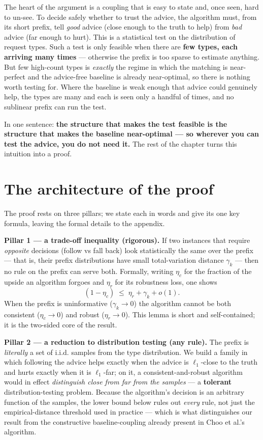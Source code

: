 The heart of the argument is a coupling that is easy to state and, once seen, hard to
un-see. To decide safely whether to trust the advice, the algorithm must, from its short
prefix, tell \emph{good} advice (close enough to the truth to help) from \emph{bad} advice (far enough
to hurt). This is a statistical test on the distribution of request types. Such a test is
only feasible when there are \textbf{few types, each arriving many times} --- otherwise the prefix
is too sparse to estimate anything. But few high-count types is \emph{exactly} the regime in
which the matching is near-perfect and the advice-free baseline is already near-optimal, so
there is nothing worth testing for. Where the baseline is weak enough that advice could
genuinely help, the types are many and each is seen only a handful of times, and no
sublinear prefix can run the test.

In one sentence: \textbf{the structure that makes the test feasible is the structure that makes
the baseline near-optimal --- so wherever you can test the advice, you do not need it.} The
rest of the chapter turns this intuition into a proof.

\section{The architecture of the proof}\label{the-architecture-of-the-proof}

The proof rests on three pillars; we state each in words and give its one key formula,
leaving the formal details to the appendix.

\textbf{Pillar 1 --- a trade-off inequality (rigorous).} If two instances that require \emph{opposite}
decisions (follow vs fall back) look statistically the same over the prefix --- that is, their
prefix distributions have small total-variation distance \(\gamma_k\) --- then no rule on the
prefix can serve both. Formally, writing \(\eta_c\) for the fraction of the upside an algorithm
forgoes and \(\eta_r\) for its robustness loss, one shows
\[(1-\eta_c)\;\le\;\eta_r+\gamma_k+o(1).\]
When the prefix is uninformative (\(\gamma_k\to0\)) the algorithm cannot be both consistent
(\(\eta_c\to0\)) and robust (\(\eta_r\to0\)). This lemma is short and self-contained; it is the
two-sided core of the result.

\textbf{Pillar 2 --- a reduction to distribution testing (any rule).} The prefix is \emph{literally} a
set of i.i.d. samples from the type distribution. We build a family in which following the
advice helps exactly when the advice is \(\ell_1\)-close to the truth and hurts exactly when it
is \(\ell_1\)-far; on it, a consistent-and-robust algorithm would in effect \emph{distinguish close
from far from the samples} --- a \textbf{tolerant} distribution-testing problem. Because the
algorithm's decision is an arbitrary function of the samples, the lower bound below rules out
\emph{every} rule, not just the empirical-distance threshold used in practice --- which is what
distinguishes our result from the constructive baseline-coupling already present in Choo et
al.'s algorithm.

